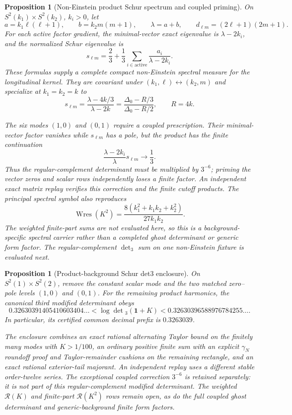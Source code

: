 \documentclass[11pt]{article}
\newtheorem{proposition}[theorem]{Proposition}
\theoremstyle{definition}
\theoremstyle{remark}
\begin{document}
\begin{proposition}[Non-Einstein product Schur spectrum and coupled priming]
On $S^2(k_1)\times S^2(k_2)$, $k_i>0$, let
\[
 a=k_1\ell(\ell+1),\qquad b=k_2m(m+1),\qquad
 \lambda=a+b,\qquad d_{\ell m}=(2\ell+1)(2m+1).
\]
For each active factor gradient, the minimal-vector exact eigenvalue is
$\lambda-2k_i$, and the normalized Schur eigenvalue is
\[
 s_{\ell m}=\frac23+\frac13\sum_{i\in\mathrm{active}}
 \frac{a_i}{\lambda-2k_i}.
\]
These formulas supply a complete compact non-Einstein spectral measure for
the longitudinal kernel.  They are covariant under
$(k_1,\ell)\leftrightarrow(k_2,m)$ and specialize at $k_1=k_2=k$ to
\[
 s_{\ell m}=\frac{\lambda-4k/3}{\lambda-2k}
 =\frac{\Delta_0-R/3}{\Delta_0-R/2},\qquad R=4k.
\]

The six modes $(1,0)$ and $(0,1)$ require a coupled prescription.  Their
minimal-vector factor vanishes while $s_{\ell m}$ has a pole, but the product
has the finite continuation
\[
 \frac{\lambda-2k_i}{\lambda}s_{\ell m}\longrightarrow\frac13.
\]
Thus the regular-complement determinant must be multiplied by $3^{-6}$;
priming the vector zeros and scalar rows independently loses a finite factor.
An independent exact matrix replay verifies this correction and the finite
cutoff products.  The principal spectral symbol also reproduces
\[
 \operatorname{Wres}(K^2)
 =\frac{8(k_1^2+k_1k_2+k_2^2)}{27k_1k_2}.
\]
The weighted finite-part sums are not evaluated here, so this is a
background-specific spectral carrier rather than a completed ghost
determinant or generic form factor.  The regular-complement $\det_3$ sum on
one non-Einstein fixture is evaluated next.
\end{proposition}

\begin{proposition}[Product-background Schur det3 enclosure]
On $S^2(1)\times S^2(2)$, remove the constant scalar mode and the two matched
zero--pole levels $(1,0)$ and $(0,1)$.  For the remaining product harmonics,
the canonical third modified determinant obeys
\[
 0.32630391405410603404\ldots
 <\log\det{}_3(\mathbf1+K)<
 0.32630396588976784255\ldots .
\]
In particular, its certified common decimal prefix is $0.3263039$.

The enclosure combines an exact rational alternating Taylor bound on the
finitely many modes with $K>1/100$, an ordinary positive finite sum with an
explicit $\gamma_N$ roundoff proof and Taylor-remainder cushions on the
remaining rectangle, and an
exact rational exterior-tail majorant.  An independent replay uses a
different stable order-twelve series.  The exceptional coupled correction
$3^{-6}$ is retained separately: it is not part of this regular-complement
modified determinant.  The weighted $\mathcal R(K)$ and finite-part
$\mathcal R(K^2)$ rows remain open, as do the full coupled ghost determinant
and generic-background finite form factors.
\end{proposition}
\end{document}
